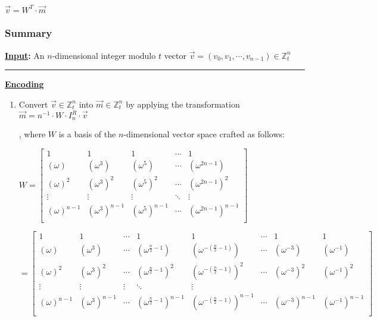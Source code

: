 $\vec{v} = W^T \cdot \vec{m}$


\subsubsection{Summary}
\label{subsubsec:bfv-encoding-summary}

\begin{tcolorbox}[title={\textbf{\tboxlabel{\ref*{subsubsec:bfv-encoding-summary}} BFV's Encoding and Decoding}}]



\textbf{\underline{Input}:} An $n$-dimensional integer modulo $t$ vector $\vec{v} = (v_0, v_1, \cdots, v_{n-1}) \in \mathbb{Z}_t^n$

\par\noindent\rule{\textwidth}{0.4pt}

\textbf{\underline{Encoding}} 
\begin{enumerate}

\item Convert $\vec{v} \in \mathbb{Z}_t^n$ into $\vec{m} \in \mathbb{Z}_t^n$ by applying the transformation $\vec{m} = n^{-1}\cdot W \cdot I_n^R \cdot \vec{v}$

, where $W$ is a basis of the $n$-dimensional vector space crafted as follows: 

$W =  \begin{bmatrix}
1 & 1 & 1 & \cdots & 1\\
(\omega) & (\omega^3) & (\omega^5) & \cdots & (\omega^{2n-1})\\
(\omega)^2 & (\omega^3)^2 & (\omega^5)^2 & \cdots & (\omega^{2n-1})^2\\
\vdots & \vdots & \vdots & \ddots & \vdots \\
(\omega)^{n-1} & (\omega^3)^{n-1} & (\omega^5)^{n-1} & \cdots & (\omega^{2n-1})^{n-1}\\
\end{bmatrix}$

$= \begin{bmatrix}
1 & 1 & \cdots & 1 & 1 & \cdots & 1 & 1\\
(\omega) & (\omega^3) & \cdots & (\omega^{\frac{n}{2} - 1}) & (\omega^{-(\frac{n}{2} - 1)}) & \cdots & (\omega^{-3}) & (\omega^{-1})\\
(\omega)^2 & (\omega^3)^2 & \cdots & (\omega^{\frac{n}{2} - 1})^2 & (\omega^{-(\frac{n}{2} - 1)})^2 & \cdots & (\omega^{-3})^2 & (\omega^{-1})^2\\
\vdots & \vdots & \vdots & \ddots & \vdots \\
(\omega)^{n-1} & (\omega^3)^{n-1} & \cdots & (\omega^{\frac{n}{2} - 1})^{n-1} & (\omega^{-(\frac{n}{2} - 1)})^{n-1} & \cdots & (\omega^{-3})^{n-1} & (\omega^{-1})^{n-1}\\
\end{bmatrix}$


\end{enumerate}
\end{tcolorbox}
